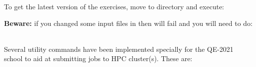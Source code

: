 \documentclass[landscape]{foils}
\begin{document}
To get the latest version of the exercises, move to  directory and execute:\\[0.5em]

{\bf Beware:} if you changed some input files in  then
 will fail and you will need to do:\\[0.5em]
\\

\rightheader{}

Several utility commands have been implemented specially for the
QE-2021 school to aid at submitting jobs to HPC cluster(s). These are:
\end{document}
